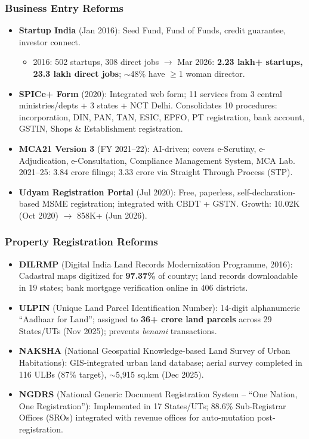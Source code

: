 \subsubsection*{Business Entry Reforms}
\begin{itemize}
  \item \textbf{Startup India} (Jan 2016): Seed Fund, Fund of Funds, credit guarantee, investor connect.
  \begin{itemize}
    \item 2016: 502 startups, 308 direct jobs $\rightarrow$ Mar 2026: \textbf{2.23 lakh+ startups, 23.3 lakh direct jobs}; $\sim$48\% have $\geq$1 woman director.
  \end{itemize}
  \item \textbf{SPICe+ Form} (2020): Integrated web form; 11 services from 3 central ministries/depts + 3 states + NCT Delhi. Consolidates 10 procedures: incorporation, DIN, PAN, TAN, ESIC, EPFO, PT registration, bank account, GSTIN, Shops \& Establishment registration.
  \item \textbf{MCA21 Version 3} (FY 2021--22): AI-driven; covers e-Scrutiny, e-Adjudication, e-Consultation, Compliance Management System, MCA Lab. 2021--25: 3.84 crore filings; 3.33 crore via Straight Through Process (STP).
  \item \textbf{Udyam Registration Portal} (Jul 2020): Free, paperless, self-declaration-based MSME registration; integrated with CBDT + GSTN. Growth: 10.02K (Oct 2020) $\rightarrow$ 858K+ (Jun 2026).
\end{itemize}

\subsubsection*{Property Registration Reforms}
\begin{itemize}
  \item \textbf{DILRMP} (Digital India Land Records Modernization Programme, 2016): Cadastral maps digitized for \textbf{97.37\%} of country; land records downloadable in 19 states; bank mortgage verification online in 406 districts.
  \item \textbf{ULPIN} (Unique Land Parcel Identification Number): 14-digit alphanumeric ``Aadhaar for Land''; assigned to \textbf{36+ crore land parcels} across 29 States/UTs (Nov 2025); prevents \textit{benami} transactions.
  \item \textbf{NAKSHA} (National Geospatial Knowledge-based Land Survey of Urban Habitations): GIS-integrated urban land database; aerial survey completed in 116 ULBs (87\% target), $\sim$5,915 sq.km (Dec 2025).
  \item \textbf{NGDRS} (National Generic Document Registration System -- ``One Nation, One Registration''): Implemented in 17 States/UTs; 88.6\% Sub-Registrar Offices (SROs) integrated with revenue offices for auto-mutation post-registration.
\end{itemize}

